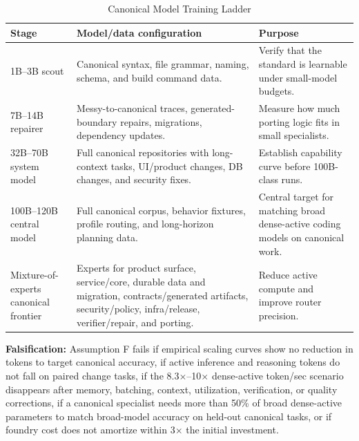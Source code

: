 \begin{table}[t]
\caption{Canonical Model Training Ladder}
\label{tab:ladder}
\centering
\footnotesize
\begin{tabularx}{\textwidth}{p{}X X}
\toprule
Stage & Model/data configuration & Purpose \\
\midrule
1B--3B scout & Canonical syntax, file grammar, naming, schema, and build command data. & Verify that the standard is learnable under small-model budgets. \\
7B--14B repairer & Messy-to-canonical traces, generated-boundary repairs, migrations, dependency updates. & Measure how much porting logic fits in small specialists. \\
32B--70B system model & Full canonical repositories with long-context tasks, UI/product changes, DB changes, and security fixes. & Establish capability curve before 100B-class runs. \\
100B--120B central model & Full canonical corpus, behavior fixtures, profile routing, and long-horizon planning data. & Central target for matching broad dense-active coding models on canonical work. \\
Mixture-of-experts canonical frontier & Experts for product surface, service/core, durable data and migration, contracts/generated artifacts, security/policy, infra/release, verifier/repair, and porting. & Reduce active compute and improve router precision. \\
\bottomrule
\end{tabularx}
\end{table}

\textbf{Falsification:} Assumption F fails if empirical scaling curves show no reduction in tokens to target canonical accuracy, if active inference and reasoning tokens do not fall on paired change tasks, if the 8.3$\times$--10$\times$ dense-active token/sec scenario disappears after memory, batching, context, utilization, verification, or quality corrections, if a canonical specialist needs more than 50\% of broad dense-active parameters to match broad-model accuracy on held-out canonical tasks, or if foundry cost does not amortize within 3$\times$ the initial investment.

